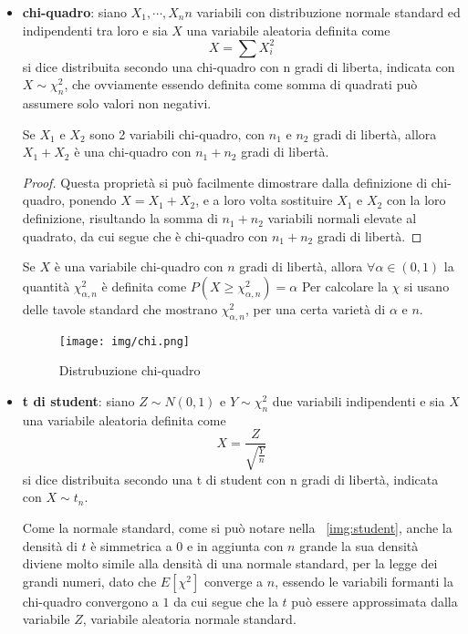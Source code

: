 \documentclass[a4paper,12pt, oneside]{book}
\begin{document}
\begin{itemize}
    \item \textbf{chi-quadro}: siano $X_1, \cdots, X_n n$ variabili con distribuzione normale standard ed
        indipendenti tra loro e sia $X$ una variabile aleatoria definita come 
        \[ X = \sum X_i ^ 2 \]
        si dice distribuita secondo una chi-quadro con n gradi di liberta, indicata con $X \sim \chi_n^2$,
        che ovviamente essendo definita come somma di quadrati può assumere solo valori non negativi.
        
\begin{teo}
        Se $X_1$ e $X_2$ sono 2 variabili chi-quadro, con $n_1$ e $n_2$ gradi di libertà, allora 
        $X_1 + X_2$ è una chi-quadro con $n_1 + n_2$ gradi di libertà.\newline
\end{teo}
\begin{proof}
        Questa proprietà si può facilmente dimostrare dalla definizione di chi-quadro, ponendo $X = X_1 + X_2$,
        e a loro volta sostituire $X_1$ e $X_2$ con la loro definizione, risultando la somma di $n_1 + n_2$ variabili
        normali elevate al quadrato, da cui segue che è chi-quadro con $n_1 + n_2$ gradi di libertà.
\end{proof}
        Se $X$ è una variabile chi-quadro con $n$ gradi di libertà, allora $\forall \alpha \in (0, 1)$ la quantità
        $\chi_{\alpha, n}^2$ è definita come $P(X \geq \chi_{\alpha, n}^2) = \alpha$
        Per calcolare la $\chi$ si usano delle tavole standard che mostrano $\chi^2_{\alpha, n}$, per una certa
        varietà di $\alpha$ e $n$.
    \begin{figure}
            \caption{Distrubuzione chi-quadro}
	        \texttt{[image: img/chi.png]}
        \end{figure}
    \item \textbf{t di student}: siano $Z \sim N(0, 1)$ e $Y \sim \chi_n^2$ due variabili indipendenti e
        sia $X$ una variabile aleatoria definita come 
        \[X = \frac{Z}{\sqrt{\frac{Y}{n}}}\]
        si dice distribuita secondo una t di student con n gradi di libertà, indicata con $X \sim t_n$.

        Come la normale standard, come si può notare nella \figurename~\ref{img:student}, anche la densità di $t$
        è simmetrica a $0$ e in aggiunta con $n$ grande la sua densità diviene molto simile alla densità di una 
        normale standard, per la legge dei grandi numeri, dato che $E[\chi^2]$ converge a $n$, essendo le variabili
        formanti la chi-quadro convergono a $1$ da cui segue che la $t$ può essere approssimata dalla variabile $Z$,
        variabile aleatoria normale standard.
        

\end{itemize}
\end{document}
